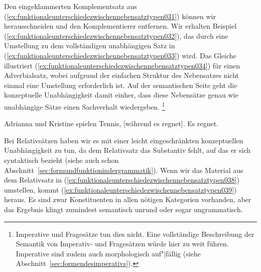 Den eingeklammerten Komplementsatz aus (\ref{ex:funktionaleunterschiedezwischennebensatztypen031}) können wir herausschneiden und den Komplementierer entfernen.
Wir erhalten Beispiel (\ref{ex:funktionaleunterschiedezwischennebensatztypen032}), das durch eine Umstellung zu dem vollständigen unabhängigen Satz in (\ref{ex:funktionaleunterschiedezwischennebensatztypen033}) wird.
Das Gleiche illustriert (\ref{ex:funktionaleunterschiedezwischennebensatztypen034}) für einen Adverbialsatz, wobei aufgrund der einfachen Struktur des Nebensatzes nicht einmal eine Umstellung erforderlich ist.
Auf der semantischen Seite geht die konzeptuelle Unabhängigkeit damit einher, dass diese Nebensätze genau wie unabhängige Sätze einen Sachverhalt wiedergeben.%
\footnote{Imperative und Fragesätze tun dies nicht.
Eine vollständige Beschreibung der Semantik von Imperativ- und Fragesätzen würde hier zu weit führen.
Imperative sind zudem auch morphologisch auf"|fällig (siehe Abschnitt~\ref{sec:formendesimperativs}).}

\begin{exe}
  \ex\label{ex:funktionaleunterschiedezwischennebensatztypen034}
  \begin{xlist}
    \ex\label{ex:funktionaleunterschiedezwischennebensatztypen035} Adrianna und Kristine spielen Tennis, [während es regnet].
    \ex\label{ex:funktionaleunterschiedezwischennebensatztypen036} Es regnet.
  \end{xlist}
\end{exe}

Bei Relativsätzen haben wir es mit einer leicht eingeschränkten konzeptuellen Unabhängigkeit zu tun, da dem Relativsatz das Substantiv fehlt, auf das er sich syntaktisch bezieht (siehe auch schon Abschnitt~\ref{sec:formundfunktionindergrammatik}).
Wenn wir das Material aus dem Relativsatz in (\ref{ex:funktionaleunterschiedezwischennebensatztypen038}) umstellen, kommt (\ref{ex:funktionaleunterschiedezwischennebensatztypen039}) heraus.
Es sind zwar Konstituenten in allen nötigen Kategorien vorhanden, aber das Ergebnis klingt zumindest semantisch unrund oder sogar ungrammatisch.

\begin{exe}
  \ex\label{ex:funktionaleunterschiedezwischennebensatztypen037}
  \begin{xlist}
  \end{xlist}
\end{exe}

